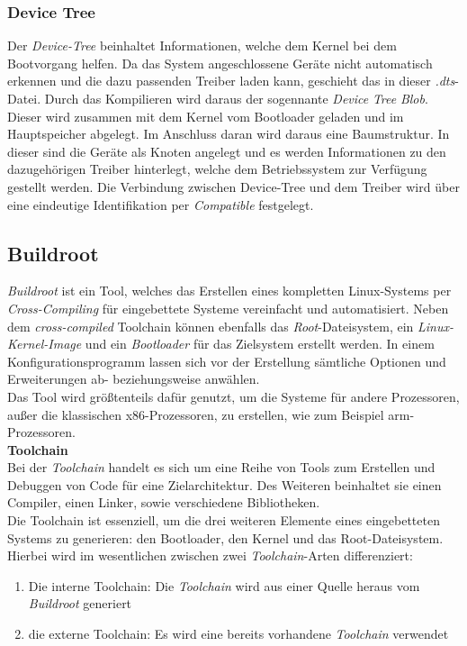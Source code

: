\subsubsection{Device Tree}\label{kap:devicetree}


Der \emph{Device-Tree} beinhaltet
Informationen, welche dem Kernel bei dem Bootvorgang helfen. Da das System angeschlossene Geräte nicht automatisch erkennen
und die dazu passenden Treiber laden kann, geschieht das in dieser \emph{.dts}-Datei. Durch das Kompilieren wird daraus
der sogennante \emph{Device} \emph{Tree} \emph{Blob}. Dieser wird zusammen mit dem Kernel vom Bootloader geladen und im
Hauptspeicher abgelegt. Im Anschluss daran wird daraus eine Baumstruktur. In dieser sind die Geräte als Knoten angelegt
und es werden Informationen zu den dazugehörigen Treiber hinterlegt, welche dem Betriebssystem zur Verfügung gestellt werden.
Die Verbindung zwischen Device-Tree und dem Treiber wird über eine
eindeutige Identifikation per \emph{Compatible} festgelegt.


\subsection{Buildroot}\label{kap:buildroot}

\emph{Buildroot} ist ein Tool, welches das Erstellen eines kompletten Linux-Systems per
\emph{Cross-Compiling} für eingebettete Systeme vereinfacht und automatisiert.  Neben dem
\emph{cross-compiled} Toolchain können ebenfalls das \emph{Root}-Dateisystem, ein \emph{Linux-Kernel-Image}
und ein \emph{Bootloader} für das Zielsystem erstellt werden.  In einem Konfigurationsprogramm lassen sich vor der
Erstellung sämtliche Optionen und Erweiterungen ab- beziehungsweise anwählen. \\
Das Tool wird größtenteils dafür genutzt, um die Systeme für andere Prozessoren, außer die klassischen x86-Prozessoren,
zu erstellen, wie zum Beispiel \ac{arm}-Prozessoren.\cite{buildroot}\\

\textbf{Toolchain}\\

Bei der \emph{Toolchain} handelt es sich um eine Reihe von Tools zum Erstellen und Debuggen von Code für eine Zielarchitektur. Des Weiteren beinhaltet sie einen Compiler, einen Linker,
 sowie verschiedene Bibliotheken.\\
 Die Toolchain ist essenziell, um die drei weiteren Elemente eines eingebetteten Systems zu generieren: den Bootloader, den Kernel und das Root-Dateisystem. \\
 Hierbei wird im wesentlichen zwischen zwei \emph{Toolchain}-Arten differenziert:
 \begin{enumerate}
   \item Die interne Toolchain: Die \emph{Toolchain} wird aus einer Quelle heraus vom \emph{Buildroot} generiert
   \item die externe Toolchain: Es wird eine bereits vorhandene \emph{Toolchain} verwendet
 \end{enumerate}

